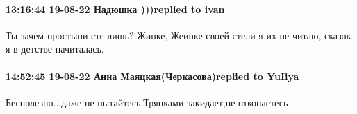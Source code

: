  
 
 
 
 

\paragraph{13:16:44 19-08-22 Надюшка )))replied to ivan}

Ты зачем простыни сте лишь? Жинке, Жеинке своей стели я их не читаю, сказок я в
детстве начиталась.

\paragraph{14:52:45 19-08-22 Анна Маяцкая(Черкасова)replied to YuIiya}

Бесполезно...даже не пытайтесь.Тряпками закидает,не откопаетесь 🤣🤣
